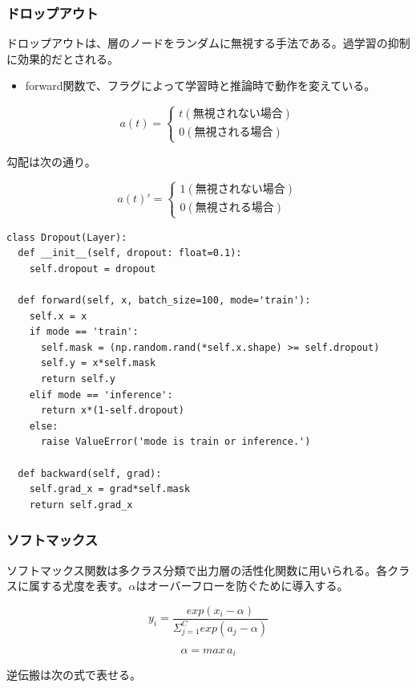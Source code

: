 \documentclass[platex,dvipdfmx]{jsarticle}
\begin{document}
\subsubsection{ドロップアウト}

ドロップアウトは、層のノードをランダムに無視する手法である。過学習の抑制に効果的だとされる。

\begin{itemize}
  \item forward関数で、フラグによって学習時と推論時で動作を変えている。
\end{itemize}

\[
  a(t) = \left\{ \begin{array}{l}
  t ( 無視されない場合 ) \\
  0 ( 無視される場合 )
  \end{array} \right.
\]

勾配は次の通り。

\[
  a(t)' = \left\{ \begin{array}{l}
  1 ( 無視されない場合 ) \\
  0 ( 無視される場合 )
  \end{array} \right.
\]

\begin{lstlisting}[caption=ex\_advanced.py, label=Dropout]
class Dropout(Layer):
  def __init__(self, dropout: float=0.1):
    self.dropout = dropout
  
  def forward(self, x, batch_size=100, mode='train'):
    self.x = x
    if mode == 'train':
      self.mask = (np.random.rand(*self.x.shape) >= self.dropout)
      self.y = x*self.mask
      return self.y
    elif mode == 'inference':
      return x*(1-self.dropout)
    else:
      raise ValueError('mode is train or inference.')

  def backward(self, grad):
    self.grad_x = grad*self.mask
    return self.grad_x
\end{lstlisting}

\subsubsection{ソフトマックス}
ソフトマックス関数は多クラス分類で出力層の活性化関数に用いられる。各クラスに属する尤度を表す。$\alpha$はオーバーフローを防ぐために導入する。

\[
  y_i = \frac{exp(x_i - \alpha)}{\Sigma_{j=1}^C exp(a_j - \alpha)}
\]

\[
  \alpha = max \, a_i
\]

逆伝搬は次の式で表せる。
\end{document}
